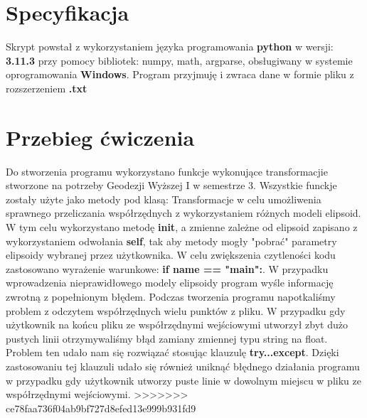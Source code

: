 \section{Specyfikacja}

\begin{flushleft}
	\hspace{1cm}Skrypt powstał z wykorzystaniem języka programowania \textbf{python} w wersji: \textbf{3.11.3} przy pomocy bibliotek: numpy, math, argparse, obsługiwany w systemie oprogramowania \textbf{Windows}. Program przyjmuję i zwraca dane w formie pliku z rozszerzeniem \textbf{.txt}
\end{flushleft}

\section{Przebieg ćwiczenia}

\begin{flushleft}
	\hspace{1cm}Do stworzenia programu wykorzystano funkcje wykonujące transformacjie stworzone na potrzeby Geodezji Wyższej I w semestrze 3. Wszystkie funckje zostały użyte jako metody pod klasą: Transformacje w celu umożliwenia sprawnego przeliczania współrzędnych z wykorzystaniem różnych modeli elipsoid. W tym celu wykorzystano metodę \textbf{init}, a zmienne zależne od elipsoid zapisano z wykorzystaniem odwołania \textbf{self}, tak aby metody mogły "pobrać" parametry elipsoidy wybranej przez użytkownika. W celu zwiększenia czytleności kodu zastosowano wyrażenie warunkowe: \textbf{if name == "main":}. W przypadku wprowadzenia nieprawidłowego modely elipsoidy program wyśle informację zwrotną z popełnionym błędem.
	\newline
	\hspace{1cm}Podczas tworzenia programu napotkaliśmy problem z odczytem współrzędnych wielu punktów z pliku. W przypadku gdy użytkownik na końcu pliku ze współrzędnymi wejściowymi utworzył zbyt dużo pustych linii otrzymywaliśmy błąd zamiany zmiennej typu string na float. Problem ten udało nam się rozwiązać stosując klauzulę \textbf{try...except}. Dzięki zastosowaniu tej klauzuli udało się również uniknąć błędnego działania programu w przypadku gdy użytkownik utworzy puste linie w dowolnym miejscu w pliku ze współrzędnymi wejściowymi.
>>>>>>> ce78faa736f04ab9bf727d8efed13e999b931fd9
\end{flushleft}